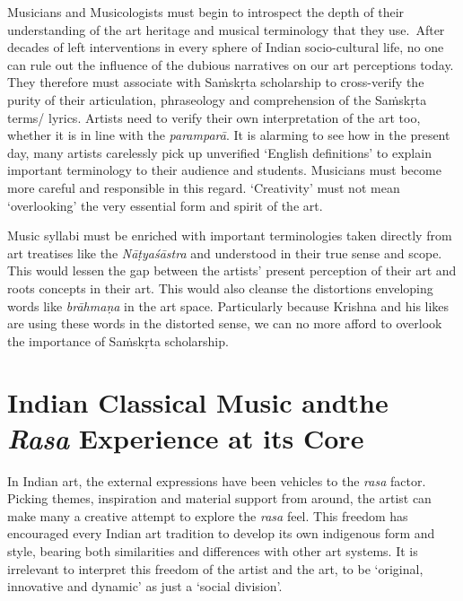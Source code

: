 Musicians and Musicologists must begin to introspect the depth of their understanding of the art heritage and musical terminology that they use.~After decades of left interventions in every sphere of Indian socio-cultural life, no one can rule out the influence of the dubious narratives on our art perceptions today. They therefore must associate with Saṁskṛta scholarship to cross-verify the purity of their articulation, phraseology and comprehension of the Saṁskṛta terms/ lyrics. Artists need to verify their own interpretation of the art too, whether it is in line with the \textit{paramparā}. It is alarming to see how in the present day, many artists carelessly pick up unverified ‘English definitions’ to explain important terminology to their audience and students. Musicians must become more careful and responsible in this regard. ‘Creativity’ must not mean ‘overlooking’ the very essential form and spirit of the art.

Music syllabi must be enriched with important terminologies taken directly from art treatises like the \textit{Nāṭyaśāstra} and understood in their true sense and scope. This would lessen the gap between the artists’ present perception of their art and roots concepts in their art. This would also cleanse the distortions enveloping words like \textit{brāhmaṇa} in the art space. Particularly because Krishna and his likes are using these words in the distorted sense, we can no more afford to overlook the importance of Saṁskṛta scholarship.

\vspace{-.3cm}

\section*{Indian Classical Music and\hfill \break the \textit{Rasa} Experience at its Core}

In Indian art, the external expressions have been vehicles to the \textit{rasa} factor. Picking themes, inspiration and material support from around, the artist can make many a creative attempt to explore the \textit{rasa} feel. This freedom has encouraged every Indian art tradition to develop its own indigenous form and style, bearing both similarities and differences with other art systems. It is irrelevant to interpret this freedom of the artist and the art, to be ‘original, innovative and dynamic’ as just a ‘social division’.

